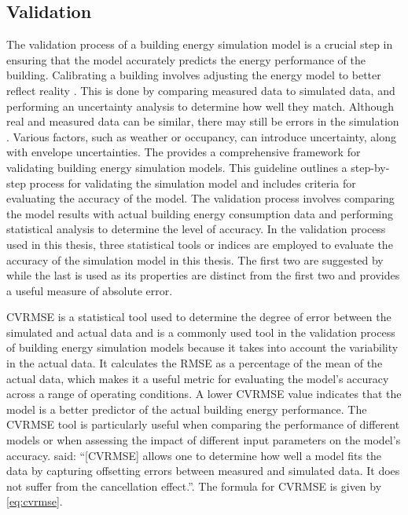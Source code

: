 \subsection{Validation}
The validation process of a building energy simulation model is a crucial step in ensuring that the model accurately predicts the energy performance of the building. Calibrating a building involves adjusting the energy model to better reflect reality \cite{coakley_review_2014,farhang2012monitoring}. This is done by comparing measured data to simulated data, and performing an uncertainty analysis to determine how well they match. Although real and measured data can be similar, there may still be errors in the simulation \cite{ashrae_guideline_project_committee_14_ashrae_2014}. Various factors, such as weather \cite{lucas2019methodology} or occupancy, can introduce uncertainty, along with envelope uncertainties. The  \cite{ashrae_guideline_project_committee_14_ashrae_2014} provides a comprehensive framework for validating building energy simulation models. This guideline outlines a step-by-step process for validating the simulation model and includes criteria for evaluating the accuracy of the model. The validation process involves comparing the model results with actual building energy consumption data and performing statistical analysis to determine the level of accuracy. In the validation process used in this thesis, three statistical tools or indices are employed to evaluate the accuracy of the simulation model in this thesis. The first two are suggested by  while the last is used as its properties are distinct from the first two and provides a useful measure of absolute error.


\ac{CVRMSE} is a statistical tool used to determine the degree of error between the simulated and actual data and is a commonly used tool in the validation process of building energy simulation models because it takes into account the variability in the actual data. It calculates the \ac{RMSE} as a percentage of the mean of the actual data, which makes it a useful metric for evaluating the model's accuracy across a range of operating conditions. A lower \ac{CVRMSE} value indicates that the model is a better predictor of the actual building energy performance. The \ac{CVRMSE} tool is particularly useful when comparing the performance of different models or when assessing the impact of different input parameters on the model's accuracy. \citeauthor{coakley_review_2014} \cite{coakley_review_2014} said: ``[\ac{CVRMSE}] allows one to determine how well a model fits the data by capturing offsetting errors between measured and simulated data. It does not suffer from the cancellation effect.''. The formula for \ac{CVRMSE} is given by \cref{eq:cvrmse}.

